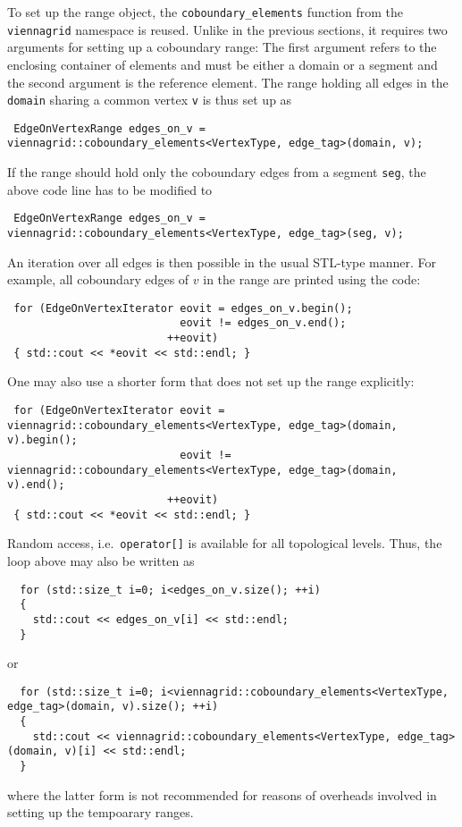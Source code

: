 To set up the range object, the \lstinline|coboundary_elements| function from the \lstinline|viennagrid| namespace is reused. Unlike in the previous sections, it requires two arguments
for setting up a coboundary range: The first argument refers to the enclosing container of elements and must be either a domain or a segment and the second argument is the reference element.
The range holding all edges in the \lstinline|domain| sharing a common vertex \lstinline|v| is thus set up as
\begin{lstlisting}
 EdgeOnVertexRange edges_on_v = viennagrid::coboundary_elements<VertexType, edge_tag>(domain, v);
\end{lstlisting}
If the range should hold only the coboundary edges from a segment \lstinline|seg|, the above code line has to be modified to
\begin{lstlisting}
 EdgeOnVertexRange edges_on_v = viennagrid::coboundary_elements<VertexType, edge_tag>(seg, v);
\end{lstlisting}
An iteration over all edges is then possible in the usual STL-type manner. For example, all coboundary edges of $v$ in the range are printed using the code:
\begin{lstlisting}
 for (EdgeOnVertexIterator eovit = edges_on_v.begin();
                           eovit != edges_on_v.end();
                         ++eovit)
 { std::cout << *eovit << std::endl; }
\end{lstlisting}
One may also use a shorter form that does not set up the range explicitly:
\begin{lstlisting}
 for (EdgeOnVertexIterator eovit = viennagrid::coboundary_elements<VertexType, edge_tag>(domain, v).begin();
                           eovit != viennagrid::coboundary_elements<VertexType, edge_tag>(domain, v).end();
                         ++eovit)
 { std::cout << *eovit << std::endl; }
\end{lstlisting}

Random access, i.e.~\lstinline|operator[]| is available for all topological levels. Thus, the loop above may also be written as
\begin{lstlisting}
  for (std::size_t i=0; i<edges_on_v.size(); ++i)
  {
    std::cout << edges_on_v[i] << std::endl;
  }
\end{lstlisting}
or 
\begin{lstlisting}
  for (std::size_t i=0; i<viennagrid::coboundary_elements<VertexType, edge_tag>(domain, v).size(); ++i)
  {
    std::cout << viennagrid::coboundary_elements<VertexType, edge_tag>(domain, v)[i] << std::endl;
  }
\end{lstlisting}
where the latter form is not recommended for reasons of overheads involved in setting up the tempoarary ranges.

